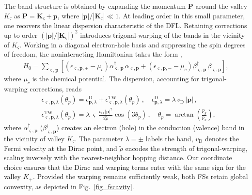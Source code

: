 The band structure is obtained by expanding the momentum $\mathbf{P}$ 
around the valley $K_\varsigma$ as $\mathbf{P} = \mathbf{K}_\varsigma 
+ \mathbf{p}$, where $|\mathbf{p}|/|\mathbf{K}_\varsigma| \ll 1$. At 
leading order in this small parameter, one recovers the linear dispersion 
characteristic of the DFL. Retaining corrections up to order 
$(|\mathbf{p}|/|\mathbf{K}_\varsigma|)^2$ introduces trigonal-warping 
of the bands \cite{ando1998, dresselhaus, neto} in the vicinity of 
$K_\varsigma$. Working in a diagonal electron-hole basis and suppressing 
the spin degrees of freedom, the noninteracting Hamiltonian takes the 
form \cite{maslov-dfl},
\begin{align}
\label{eqheh}
H_0 = \sum_{\varsigma,\mathbf{p}}
\left[
\left(\epsilon_{\varsigma,\mathbf{p},+} - \mu_c\right)
\alpha^\dagger_{\varsigma,\mathbf{p}}\,
\alpha^{\phantom{\dagger}}_{\varsigma,\mathbf{p}}
+ \left(\epsilon_{\varsigma,\mathbf{p},-} - \mu_c\right)
\beta^\dagger_{\varsigma,\mathbf{p}}\,
\beta^{\phantom{\dagger}}_{\varsigma,\mathbf{p}}
\right],
\end{align}
where $\mu_c$ is the chemical potential. The dispersion, accounting for trigonal-warping corrections, reads
\begin{align}
\label{twd}
& \epsilon_{\varsigma,\mathbf{p},\lambda}(\theta_p) =
\epsilon^\mathrm{D}_{\mathbf{p},\lambda}
+ \epsilon^\mathrm{TW}_{\varsigma,\mathbf{p},\lambda}(\theta_p)\,, \quad
\epsilon^\mathrm{D}_{\mathbf{p},\lambda} = 
\lambda\,v_\mathrm{D}\,|\mathbf{p}|\,, \nonumber \\
& \epsilon^\mathrm{TW}_{\varsigma,\mathbf{p},\lambda}(\theta_p) = 
\lambda\,\varsigma\,\frac{v_\mathrm{D}\,|\mathbf{p}|^2}{2\tilde{\rho}}
\cos(3\theta_p)\,, \quad
\theta_p = \arctan\!\left(\frac{p_y}{p_x}\right),
\end{align}
where $\alpha^\dagger_{\varsigma,\mathbf{p}}$ 
($\beta^\dagger_{\varsigma,\mathbf{p}}$) creates an electron (hole) 
in the conduction (valence) band in the vicinity of valley 
$K_\varsigma$. The parameter $\lambda = \pm$ labels the band, 
$v_\mathrm{D}$ denotes the Fermi velocity at the Dirac point, and 
$\tilde{\rho}$ encodes the strength of trigonal-warping, scaling 
inversely with the nearest-neighbor hopping distance. Our coordinate 
choice ensures that the Dirac and warping terms enter with the same 
sign for the valley $K_+$. Provided the warping remains sufficiently 
weak, both FSs retain global convexity, as depicted in 
Fig.~\ref{fig_fscavity}.



